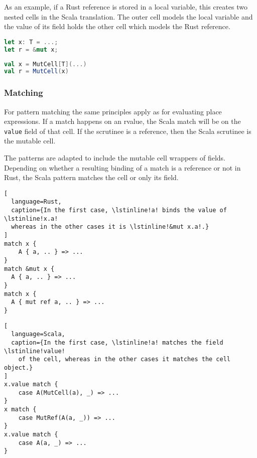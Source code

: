 As an example, if a Rust reference is stored in a local variable, this
creates two nested cells in the Scala translation. The outer cell models
the local variable and the value of its field holds the other cell which
models the Rust reference.

\noindent\begin{minipage}[t]{.45\textwidth}
\begin{lstlisting}[language=Rust]
let x: T = ...;
let r = &mut x;
\end{lstlisting}
\end{minipage}\hfill
\begin{minipage}[t]{.45\textwidth}
\begin{lstlisting}[language=Scala]
val x = MutCell[T](...)
val r = MutCell(x)
\end{lstlisting}
\end{minipage}

\subsubsection{\texorpdfstring{\textbf{Matching}}{Matching}}

For pattern matching the same principles apply as for evaluating place
expressions. If a match happens on an rvalue, the Scala match will be on
the \passthrough{\lstinline!value!} field of that cell. If the scrutinee
is a reference, then the Scala scrutinee is the mutable cell.

The patterns are adapted to include the mutable cell wrappers of fields.
Depending on whether a resulting binding of a match is a reference or
not in Rust, the Scala pattern matches the cell or only its field.

\noindent\begin{minipage}[t]{.45\textwidth}
\begin{lstlisting}[
  language=Rust,
  caption={In the first case, \lstinline!a! binds the value of \lstinline!x.a!
  whereas in the other cases it is \lstinline!&mut x.a!.}
]
match x {
    A { a, .. } => ...
}
match &mut x {
  A { a, .. } => ...
}
match x {
  A { mut ref a, .. } => ...
}
\end{lstlisting}
\end{minipage}\hfill
\begin{minipage}[t]{.45\textwidth}
\begin{lstlisting}[
  language=Scala,
  caption={In the first case, \lstinline!a! matches the field \lstinline!value!
    of the cell, whereas in the other cases it matches the cell object.}
]
x.value match {
    case A(MutCell(a), _) => ...
}
x match {
    case MutRef(A(a, _)) => ...
}
x.value match {
    case A(a, _) => ...
}
\end{lstlisting}
\end{minipage}

